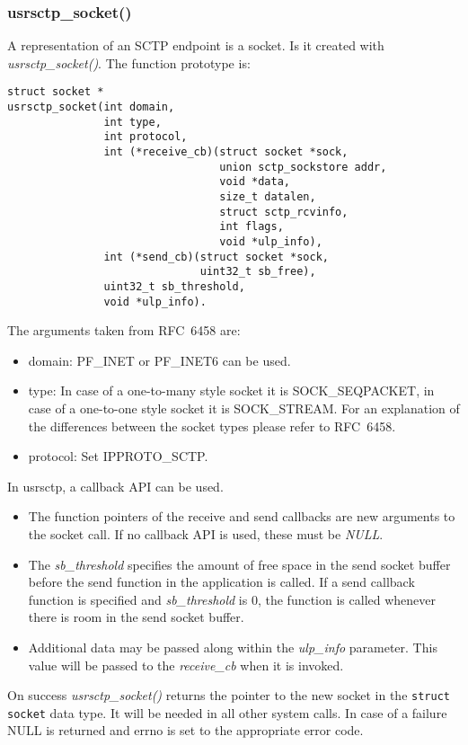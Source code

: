 \documentclass[a4paper]{article}
\begin{document}
\subsubsection{usrsctp\_socket()}
A representation of an SCTP endpoint is a socket. Is it created with \textit{usrsctp\_socket()}.
The function prototype is:
\begin{verbatim}
struct socket *
usrsctp_socket(int domain, 
               int type, 
               int protocol,
               int (*receive_cb)(struct socket *sock, 
                                 union sctp_sockstore addr, 
                                 void *data,
                                 size_t datalen, 
                                 struct sctp_rcvinfo, 
                                 int flags,
                                 void *ulp_info),
               int (*send_cb)(struct socket *sock, 
                              uint32_t sb_free),
               uint32_t sb_threshold,
               void *ulp_info).
\end{verbatim}
The arguments taken from RFC~6458 are:
\begin{itemize}
\item domain: PF\_INET or PF\_INET6 can be used.
\item type: In case of a one-to-many style socket it is SOCK\_SEQPACKET, in case of a one-to-one style 
socket it is SOCK\_STREAM. For an explanation of the differences between the socket types please
refer to RFC~6458.
\item protocol: Set IPPROTO\_SCTP.
\end{itemize}

In usrsctp, a callback API can be used.
\begin{itemize}
\item The function pointers of the receive and send callbacks are new arguments to the socket call. If no callback API is used, these must be \textit{NULL}.
\item The \textit{sb\_threshold} specifies the amount of free space in the send socket buffer before the send function in the application is called. If a send callback function is specified and \textit{sb\_threshold} is 0, the function is called whenever there is room in the send socket buffer.
\item Additional data may be passed along within the \textit{ulp\_info} parameter. This value will be passed to the \textit{receive\_cb} when it is invoked.
\end{itemize}

On success \textit{usrsctp\_socket()} returns the pointer to the new socket in the \texttt{struct socket} data type. 
It will be needed in all other system calls. In case of a failure NULL is returned and
errno is set to the appropriate error code.
\end{document}
